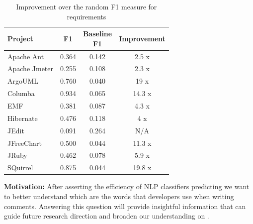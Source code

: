 \begin{table}[!hbt]
    \begin{center}
        \caption{Improvement over the random F1 measure for requirements}
        \label{tbl:improvement_f1measure_requirement}
        \begin{tabular}{l| c c c }
        \toprule
        \textbf{Project} & \textbf{F1} & \thead{Baseline\\F1} & \textbf{Improvement}\\
        \midrule
         Apache Ant      & 0.364 & 0.142  &  2.5  x\\
         Apache Jmeter   & 0.255 & 0.108  &  2.3  x\\
         ArgoUML         & 0.760 & 0.040  &  19   x\\
         Columba         & 0.934 & 0.065  &  14.3 x\\
         EMF             & 0.381 & 0.087  &  4.3  x\\
         Hibernate       & 0.476 & 0.118  &  4    x\\
         JEdit           & 0.091 & 0.264  &  N/A   \\
         JFreeChart      & 0.500 & 0.044  &  11.3 x\\
         JRuby           & 0.462 & 0.078  &  5.9  x\\
         SQuirrel        & 0.875 & 0.044  &  19.8 x\\
        \bottomrule
        \end{tabular}
    \end{center}    
\end{table}



\vspace{3mm}
\noindent\rqii
\vspace{3mm}

\noindent \textbf{Motivation:} After asserting the efficiency of NLP classifiers predicting \SATD we want to better understand which are the words that developers use when writing \SATD comments. Answering this question will provide insightful information that can guide future research direction and broaden our understanding on \SATD.     

